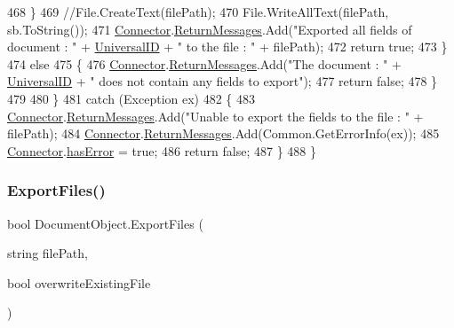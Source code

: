 \begin{DoxyCode}
468                 \}
469                 \textcolor{comment}{//File.CreateText(filePath);}
470                 File.WriteAllText(filePath, sb.ToString());
471                 \mbox{\hyperlink{class_connector}{Connector}}.\mbox{\hyperlink{class_connector_a1ed422674b344524fd77998dcf6a9ba6}{ReturnMessages}}.Add(\textcolor{stringliteral}{"Exported all fields of document : "} + 
      \mbox{\hyperlink{class_document_object_a8b96d04632a2802e7cc5466ca5cee8cf}{UniversalID}} + \textcolor{stringliteral}{" to the file : "} + filePath);
472                 \textcolor{keywordflow}{return} \textcolor{keyword}{true};
473             \}
474             \textcolor{keywordflow}{else}
475             \{
476                 \mbox{\hyperlink{class_connector}{Connector}}.\mbox{\hyperlink{class_connector_a1ed422674b344524fd77998dcf6a9ba6}{ReturnMessages}}.Add(\textcolor{stringliteral}{"The document : "} + 
      \mbox{\hyperlink{class_document_object_a8b96d04632a2802e7cc5466ca5cee8cf}{UniversalID}} + \textcolor{stringliteral}{" does not contain any fields to export"});
477                 \textcolor{keywordflow}{return} \textcolor{keyword}{false};
478             \}
479 
480         \}
481         \textcolor{keywordflow}{catch} (Exception ex)
482         \{
483             \mbox{\hyperlink{class_connector}{Connector}}.\mbox{\hyperlink{class_connector_a1ed422674b344524fd77998dcf6a9ba6}{ReturnMessages}}.Add(\textcolor{stringliteral}{"Unable to export the fields to the file : 
      "} + filePath);
484             \mbox{\hyperlink{class_connector}{Connector}}.\mbox{\hyperlink{class_connector_a1ed422674b344524fd77998dcf6a9ba6}{ReturnMessages}}.Add(Common.GetErrorInfo(ex));
485             \mbox{\hyperlink{class_connector}{Connector}}.\mbox{\hyperlink{class_connector_a079bae21a5417efa53bfe8954c0f533f}{hasError}} = \textcolor{keyword}{true};
486             \textcolor{keywordflow}{return} \textcolor{keyword}{false};
487         \}
488     \}
\end{DoxyCode}
\mbox{\label{class_document_object_a8753abc5a871bf84fc910e6a99936b2b}} 
\subsubsection{\texorpdfstring{Export\+Files()}{ExportFiles()}}
{\footnotesize\ttfamily bool Document\+Object.\+Export\+Files (\begin{DoxyParamCaption}\item[{string}]{file\+Path,  }\item[{bool}]{overwrite\+Existing\+File }\end{DoxyParamCaption})}



